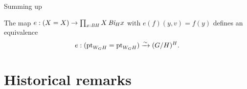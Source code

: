 Summing up
\begin{lemma}
  \label{lem:WGHisHfixofG/H}
  The map  $e:(X=X)\to \prod_{x:\mathit{B}\mathit{H}}X\, \mathit{B}\mathit{i}_Hx$ with $e(f)(y,v)=f(y)$ defines an equivalence
$$e:(\mathrm{pt}_{W_GH}=\mathrm{pt}_{W_GH})\xrightarrow{\sim} (G/H)^H.$$
\end{lemma}


\section{Historical remarks}
\label{sec:grouphistory}


